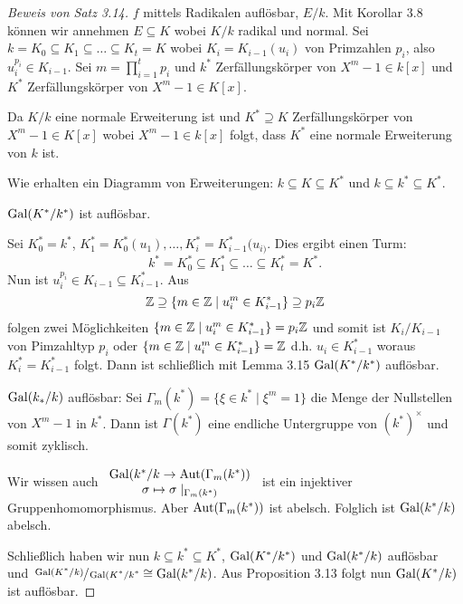 \begin{proof}[Beweis von Satz 3.14]
	$f$ mittels Radikalen auflösbar, $E /k$. Mit Korollar 3.8 können wir annehmen $E \subseteq K$ wobei $K / k$ radikal und normal.
	Sei $k = K_0 \subseteq K_{1} \subseteq \ldots \subseteq K_{t} = K$ wobei $K_{i} = K_{i-1}(u_{i})$ von Primzahlen $p_{i}$, also $u_{i}^{p_{i}} \in K_{i-1}$.
	Sei $m = \prod_{i=1}^{t} p_{i}$ und $k^{*}$ Zerfällungskörper von $X^{m}-1 \in k[x]$ und $K^{*}$ Zerfällungskörper von $X^{m}-1 \in K[x]$.

	Da $K / k$ eine normale Erweiterung ist und $K^{*} \supseteq K$ Zerfällungskörper von $X^{m} - 1 \in K[x]$ wobei $X^{m}-1 \in k[x]$ folgt, dass $K^{*}$ 
	eine normale Erweiterung von $k$ ist.

	Wie erhalten ein Diagramm von Erweiterungen: $k \subseteq K \subseteq K^{*}$ und $k \subseteq k^{*} \subseteq K^{*}$.
	\begin{claim}
		$\operatorname{Gal}(K^{*} / k^{*})$ ist auflösbar.
	\end{claim}
	Sei $K^{*}_{0} = k^{*}$, $K^{*}_{1} = K_{0}^{*}(u_1),\ldots, K_{i}^{*} = K_{i-1}^{*}(u_{i)}$.
	Dies ergibt einen Turm:
	\[
		k^{*} = K_0^{*} \subseteq K_1^{*} \subseteq \ldots \subseteq K_{t}^{*} = K^{*}
	.\] 
	Nun ist $u_{i}^{p_{i}} \in K_{i-1} \subseteq K_{i-1}^{*}$. Aus
	\[
	\mathbb{Z} \supseteq \{m \in \mathbb{Z} \mid u_{i}^{m} \in K_{i-1}^{*}\} \supseteq p_{i} \mathbb{Z}
	\] 
	folgen zwei Möglichkeiten $\{m \in \mathbb{Z} \mid u_{i}^{m} \in K_{i-1}^{*}\} = p_{i} \mathbb{Z}$ und somit ist $K_{i} / K_{i-1}$ von Pimzahltyp $p_{i}$ 
	oder $\{m \in \mathbb{Z} \mid u_{i}^{m} \in K_{i-1}^{*}\} = \mathbb{Z}$ d.h. $u_{i} \in K_{i-1}^{*}$ woraus $K_{i}^{*} = K_{i-1}^{*}$ folgt.
	Dann ist schließlich mit Lemma 3.15 $\operatorname{Gal}(K^{*} /k^{*})$ auflösbar.

	\begin{claim}
		$\operatorname{Gal}(k_{*} / k)$ auflösbar: Sei $\Gamma_{m}(k^{*}) = \{\xi \in k^{*} \mid \xi^{m} = 1\}$ die Menge der Nullstellen
		von $X^{m}-1$ in $k^{*}$. Dann ist $\Gamma(k^{*})$ eine endliche Untergruppe von $(k^{*})^{\times}$ und somit zyklisch.

		Wir wissen auch $\begin{array}{c} \operatorname{Gal}(k^{*} / k \to \operatorname{Aut}(\Gamma_{m}(k^{*}))\\ \sigma \mapsto \sigma \mid_{\Gamma_{m}(k^{*})}\\ \end{array}$
		ist ein injektiver Gruppenhomomorphismus. Aber $\operatorname{Aut}(\Gamma_{m}(k^{*}))$ ist abelsch.
		Folglich ist $\operatorname{Gal}(k^{*} / k)$ abelsch.
	\end{claim}

	Schließlich haben wir nun $k \subseteq k^{*} \subseteq K^{*}$, $\operatorname{Gal}(K^{*} / k^{*})$ und $\operatorname{Gal}(k^{*} / k)$ auflösbar
	und $\sfrac{\operatorname{Gal}(K^{*}/k)}{\operatorname{Gal}(K^{*} / k^{*}} \cong \operatorname{Gal}(k^{*} / k)$.
	Aus Proposition 3.13 folgt nun $\operatorname{Gal}(K^{*} / k)$ ist auflösbar.


\end{proof}
